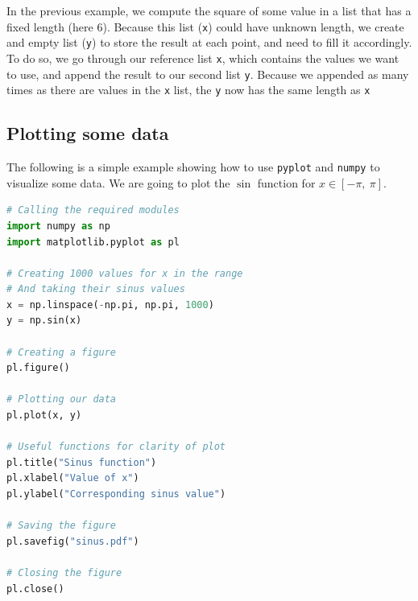 \documentclass[twocolumn]{article}
\begin{document}
In the previous example, we compute the square of some value in a list that has a fixed length (here 6). Because this list (\verb|x|) could have unknown length, we create and empty list (\verb|y|) to store the result at each point, and need to fill it accordingly. To do so, we go through our reference list \verb|x|, which contains the values we want to use, and append the result to our second list \verb|y|. Because we appended as many times as there are values in the \verb|x| list, the \verb|y| now has the same length as \verb|x|

\subsection{Plotting some data}\label{app:plots}

The following is a simple example showing how to use \verb|pyplot| and \verb|numpy| to visualize some data. We are going to plot the $\sin$ function for $x\in[-\pi,~\pi]$.

\begin{lstlisting}[language=Python]
# Calling the required modules
import numpy as np
import matplotlib.pyplot as pl

# Creating 1000 values for x in the range
# And taking their sinus values
x = np.linspace(-np.pi, np.pi, 1000)
y = np.sin(x)

# Creating a figure
pl.figure()

# Plotting our data
pl.plot(x, y)

# Useful functions for clarity of plot
pl.title("Sinus function")
pl.xlabel("Value of x")
pl.ylabel("Corresponding sinus value")

# Saving the figure
pl.savefig("sinus.pdf")

# Closing the figure
pl.close()
\end{lstlisting}

%
\end{document}
